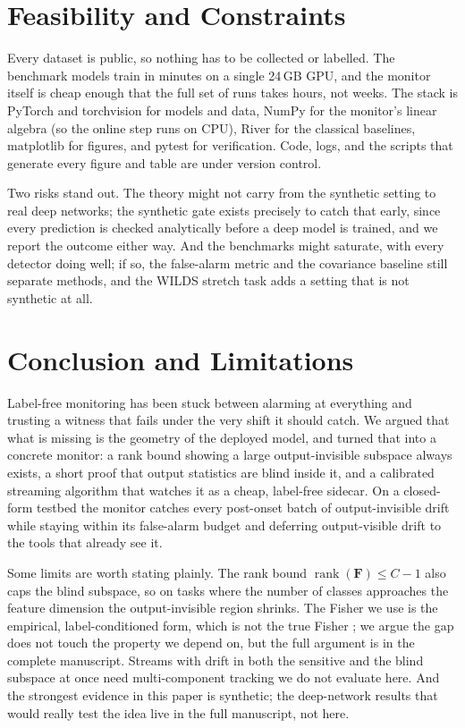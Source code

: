 \documentclass[sigconf,anonymous]{acmart}
\begin{document}
\section{Feasibility and Constraints}
\label{sec:feasibility}

Every dataset is public, so nothing
has to be collected or labelled. The benchmark models train in minutes on a
single 24\,GB GPU, and the monitor itself is cheap enough that the full set of
runs takes hours, not weeks. The stack is PyTorch and torchvision for models
and data, NumPy for the monitor's linear algebra (so the online step runs on
CPU), River \cite{montiel2021river} for the classical baselines, matplotlib
for figures, and pytest for verification. Code, logs, and the scripts that
generate every figure and table are under version control.

Two risks stand out. The theory might not carry from the synthetic setting to
real deep networks; the synthetic gate exists precisely to catch that early,
since every prediction is checked analytically before a deep model is trained,
and we report the outcome either way. And the benchmarks might saturate, with
every detector doing well; if so, the false-alarm metric and the covariance
baseline still separate methods, and the WILDS stretch task adds a setting
that is not synthetic at all.

\section{Conclusion and Limitations}
\label{sec:conclusion}

Label-free monitoring has been stuck between alarming at everything and
trusting a witness that fails under the very shift it should catch. We argued
that what is missing is the geometry of the deployed model, and turned that
into a concrete monitor: a rank bound showing a large output-invisible
subspace always exists, a short proof that output statistics are blind inside
it, and a calibrated streaming algorithm that watches it as a cheap,
label-free sidecar. On a closed-form testbed the monitor catches every
post-onset batch of output-invisible drift while staying within its
false-alarm budget and deferring output-visible drift to the tools that
already see it.

Some limits are worth stating plainly. The rank bound $\operatorname{rank}
(\mathbf{F}) \le C-1$ also caps the blind subspace, so on tasks where the
number of classes approaches the feature dimension the output-invisible region
shrinks. The Fisher we use is the empirical, label-conditioned form, which is
not the true Fisher \cite{kunstner2019empirical}; we argue the gap does not
touch the property we depend on, but the full argument is in the complete
manuscript. Streams with drift in both the sensitive and the blind subspace at
once need multi-component tracking we do not evaluate here. And the strongest
evidence in this paper is synthetic; the deep-network results that would really
test the idea live in the full manuscript, not here.



\end{document}
